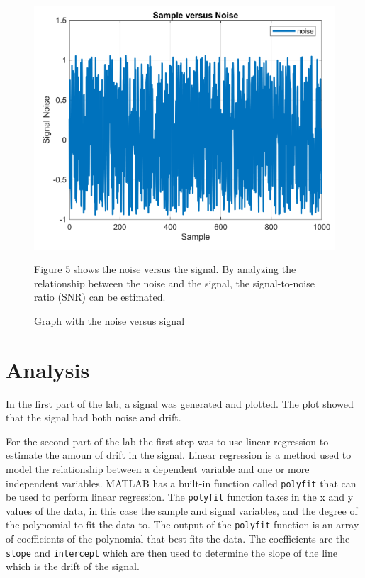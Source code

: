 \documentclass[journal]{IEEEtran}
\begin{document}
\begin{figure}[ht] %
    \centering
    \includegraphics[width=\linewidth]{5.1 plot.png}
    \caption{Graph with the noise versus signal}
    \vspace{1em} %
    \begin{minipage}{\linewidth}
        \small
        Figure 5 shows the noise versus the signal. By analyzing the relationship between the noise and the signal, the signal-to-noise ratio (SNR) can be estimated.
    \end{minipage}
    \label{Part 5: No Noise Graph}
\end{figure}

\section{Analysis}
In the first part of the lab, a signal was generated and plotted. The plot showed that the signal had both noise and drift.

For the second part of the lab the first step was to use linear regression to estimate the amoun of drift in the signal. Linear regression is a method used to model the relationship between a dependent variable and one or more independent variables. MATLAB has a built-in function called \texttt{polyfit} that can be used to perform linear regression. The \texttt{polyfit} function takes in the x and y values of the data, in this case the sample and signal variables, and the degree of the polynomial to fit the data to. The output of the \texttt{polyfit} function is an array of coefficients of the polynomial that best fits the data. The coefficients are the \texttt{slope} and \texttt{intercept} which are then used to determine the slope of the line which is the drift of the signal.
\end{document}
